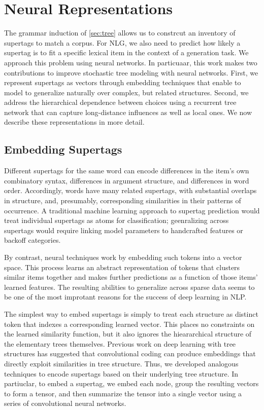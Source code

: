 \documentclass[11pt]{article}
\begin{document}
\section{Neural Representations}
\label{sec:neural}

The grammar induction of \ref{sec:tree} allows us to constrcut an
inventory of supertags to match a corpus.  For NLG, we also need to
predict how likely a supertag is to fit a specific lexical item in the
context of a generation task.  We approach this problem using neural
networks. 
%
In particuaar, this work makes two contributions to improve stochastic
tree modeling with neural networks.
%
First, we represent supertags as vectors through embedding techniques
that enable to model to generalize naturally over complex, but related
structures.
%
Second, we address the hierarchical dependence between choices using a
recurrent tree network that can capture long-distance influences as
well as local ones.
%
We now describe these representations in more detail.

\subsection{Embedding Supertags}

Different supertags for the same word can encode differences in the
item's own combinatory syntax, differences in argument structure, and
differences in word order.  Accordingly, words have many related
supertags, with substantial overlaps in structure, and, presumably,
corresponding similarities in their patterns of occurrence.  A
traditional machine learning approach to supertag prediction would
treat individual supertags as atoms for classification; geenralizing
across supertags would require linking model parameters to handcrafted
features or backoff categories.

By contrast, neural techniques work by embedding such tokens into a
vector space. This process learns an abstract representation of tokens
that clusters similar items together and makes further predictions
as a function of those items' learned features.  The resulting
abilities to generalize across sparse data seems to be one of the most
improtant reasons for the success of deep learning in NLP.

The simplest way to embed supertags is simply to treat each structure
as distinct token that indexes a corresponding learned vector.  This
places no constraints on the learned similarity function, but it also
ignores the hieararchical structure of the elementary trees
themselves.  Previous work on deep learning with tree structures has
suggested that convolutional coding can produce embeddings that
directly exploit similarities in tree structure.  Thus, we developed
analogous techniques to encode supertags based on their underlying
tree structure.  In partiuclar, to embed a supertag, we embed each
node, group the resulting vectors to form a tensor, and then summarize
the tensor into a single vector using a series of convolutional neural
networks.
\end{document}
